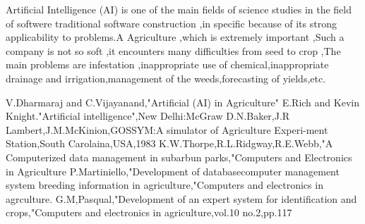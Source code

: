 \documentclass[a4paper]{article}
\begin{document}
Artificial Intelligence (AI) is one of the main fields of science studies in the field of softwere \cite{a1} traditional software construction ,in specific because of its strong applicability to problems\cite{a2}.A Agriculture ,which is extremely important ,Such a company is not so soft\cite{a3}\cite{a4} ,it encounters many difficulties from seed to crop\cite{a5} ,The main problems are infestation ,inappropriate use of chemical,inappropriate drainage and irrigation,management of the weeds,forecasting of yields,etc.\cite{a6}
	\begin{thebibliography}{10}
		V.Dharmaraj and C.Vijayanand,"Artificial (AI) in Agriculture"
		E.Rich and Kevin Knight."Artificial intelligence",New Delhi:McGraw
		D.N.Baker,J.R Lambert,J.M.McKinion,GOSSYM:A simulator of Agriculture Experi-ment Station,South Carolaina,USA,1983
		K.W.Thorpe,R.L.Ridgway,R.E.Webb,"A Computerized data management in subarbun parks,"Computers and Electronics in Agriculture
		P.Martiniello,"Development of databasecomputer management system breeding information in agriculture,"Computers and electronics in agrculture.
		G.M,Pasqual,"Development of an expert system for identification and crops,"Computers and electronics in agriculture,vol.10 no.2,pp.117
	\end{thebibliography}
\end{document}
